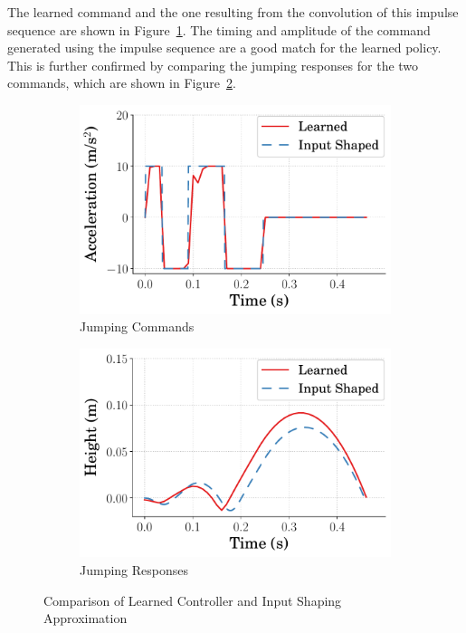 The learned command and the one resulting from the convolution of this impulse sequence are shown in Figure~\ref{fig:learned_shaped_command_comparison}. The timing and amplitude of the command generated using the impulse sequence are a good match for the learned policy. This is further confirmed by comparing the jumping responses for the two commands, which are shown in Figure~\ref{fig:learned_shaped_response_comparison}.
%
\begin{figure}[tb!]
\centering
    \begin{subfigure}{0.49\columnwidth}
    \centering
    \includegraphics[width=\columnwidth]{Figures/Ch3/input_shaping/learned_shaped_command_comparison.pdf}  
    \caption{Jumping Commands}
    \label{fig:learned_shaped_command_comparison}
    \end{subfigure}
    \hfill
    \begin{subfigure}{0.49\columnwidth}
    \centering
    \includegraphics[width=\columnwidth]{Figures/Ch3/input_shaping/learned_shaped_response_comparison.pdf}  
    \caption{Jumping Responses}
    \label{fig:learned_shaped_response_comparison}
    \end{subfigure}
\caption{Comparison of Learned Controller and Input Shaping Approximation} %
\label{fig:rl_shaping_comparison}	%
\end{figure}
%

